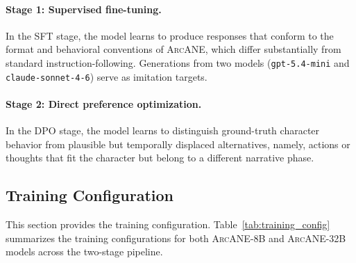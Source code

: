 \documentclass{llmxive}
\providecommand{\ours}{\textsc{ArcANE}}
\begin{document}
\paragraph{Stage 1: Supervised fine-tuning.} In the SFT stage, the model learns to produce responses that conform to the format and behavioral conventions of \ours{}, which differ substantially from standard instruction-following. Generations from two models (\texttt{gpt-5.4-mini} and \texttt{claude-sonnet-4-6}) serve as imitation targets.
 
\paragraph{Stage 2: Direct preference optimization.} In the DPO stage, the model learns to distinguish ground-truth character behavior from plausible but temporally displaced alternatives, namely, actions or thoughts that fit the character but belong to a different narrative phase.


\subsection{Training Configuration}
\label{app:training_model}
This section provides the training configuration. Table~\ref{tab:training_config} summarizes the training configurations for both \ours{}-8B and \ours{}-32B models across the two-stage pipeline.
\end{document}
